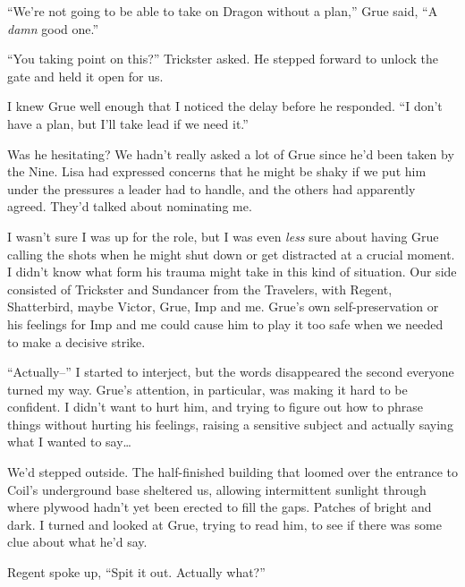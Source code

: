 





``We're not going to be able to take on Dragon without a plan,'' Grue said, ``A \emph{damn} good one.''



``You taking point on this?'' Trickster asked.  He stepped forward to unlock the gate and held it open for us.



I knew Grue well enough that I noticed the delay before he responded. ``I don't have a plan, but I'll take lead if we need it.''



Was he hesitating?  We hadn't really asked a lot of Grue since he'd been taken by the Nine.  Lisa had expressed concerns that he might be shaky if we put him under the pressures a leader had to handle, and the others had apparently agreed.  They'd talked about nominating me.



I wasn't sure I was up for the role, but I was\emph{ }even \emph{less} sure about having Grue calling the shots when he might shut down or get distracted at a crucial moment.  I didn't know what form his trauma might take in this kind of situation.  Our side consisted of Trickster and Sundancer from the Travelers, with Regent, Shatterbird, maybe Victor, Grue, Imp and me. Grue's own self-preservation or his feelings for Imp and me could cause him to play it too safe when we needed to make a decisive strike.



``Actually--'' I started to interject, but the words disappeared the second everyone turned my way.  Grue's attention, in particular, was making it hard to be confident.  I didn't want to hurt him, and trying to figure out how to phrase things without hurting his feelings, raising a sensitive subject and actually saying what I wanted to say\ldots



We'd stepped outside.  The half-finished building that loomed over the entrance to Coil's underground base sheltered us, allowing intermittent sunlight through where plywood hadn't yet been erected to fill the gaps.  Patches of bright and dark.  I turned and looked at Grue, trying to read him, to see if there was some clue about what he'd say.



Regent spoke up, ``Spit it out.  Actually what?''



